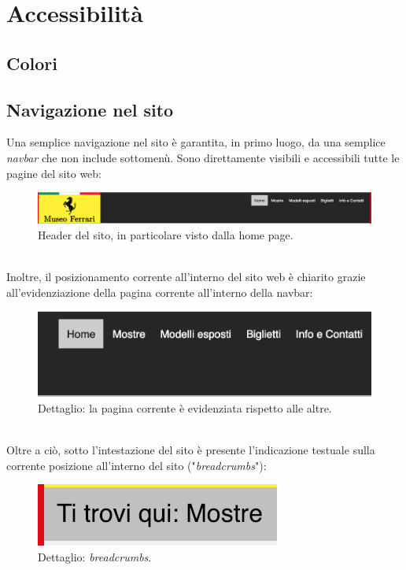 \section{Accessibilità}
\subsection{Colori}


\subsection{Navigazione nel sito}
Una semplice navigazione nel sito è garantita, in primo luogo, da una semplice \textit{navbar} che non include sottomenù. Sono direttamente visibili e accessibili tutte le pagine del sito web:
\begin{figure}[h]
		\begin{center}
		\includegraphics[scale=0.3]{Images/headerSito.png}
		\caption{Header del sito, in particolare visto dalla home page.}
	\end{center}
\end{figure}\\
Inoltre, il posizionamento corrente all'interno del sito web è chiarito grazie all'evidenziazione della pagina corrente all'interno della navbar:
\begin{figure}[h]
	\begin{center}
		\includegraphics[scale=0.2]{Images/selezionePaginaCorrente.png}
		\caption{Dettaglio: la pagina corrente è evidenziata rispetto alle altre.}
	\end{center}
\end{figure}\\
Oltre a ciò, sotto l'intestazione del sito è presente l'indicazione testuale sulla corrente posizione all'interno del sito ("\textit{breadcrumbs}"):
\begin{figure}[h]
	\begin{center}
		\includegraphics[scale=0.6]{Images/breadcrumbs.png}
		\caption{Dettaglio: \textit{breadcrumbs}.}
	\end{center}
\end{figure}\\
